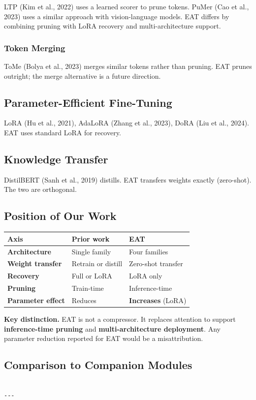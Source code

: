 LTP (Kim et al., 2022) uses a learned scorer to prune tokens. PuMer (Cao et 
al., 2023) uses a similar approach with vision-language models. EAT differs 
by combining pruning with LoRA recovery and multi-architecture support.

\subsubsection{Token Merging}

ToMe (Bolya et al., 2023) merges similar tokens rather than pruning. EAT 
prunes outright; the merge alternative is a future direction.

\subsection{Parameter-Efficient Fine-Tuning}

LoRA (Hu et al., 2021), AdaLoRA (Zhang et al., 2023), DoRA (Liu et al., 2024). 
EAT uses standard LoRA for recovery.

\subsection{Knowledge Transfer}

DistilBERT (Sanh et al., 2019) distills. EAT transfers weights exactly 
(zero-shot). The two are orthogonal.

\subsection{Position of Our Work}

\begin{table}[H]
\centering
\small
\begin{tabular}{lll}
\toprule
\textbf{Axis} & \textbf{Prior work} & \textbf{EAT} \\
\midrule
\textbf{Architecture} & Single family & Four families \\
\textbf{Weight transfer} & Retrain or distill & Zero-shot transfer \\
\textbf{Recovery} & Full or LoRA & LoRA only \\
\textbf{Pruning} & Train-time & Inference-time \\
\textbf{Parameter effect} & Reduces & \textbf{Increases} (LoRA) \\
\bottomrule
\end{tabular}
\end{table}

\textbf{Key distinction.} EAT is not a compressor. It replaces attention to 
support \textbf{inference-time pruning} and \textbf{multi-architecture deployment}. 
Any parameter reduction reported for EAT would be a misattribution.

\subsection{Comparison to Companion Modules}

\begin{lstlisting}

---
\end{lstlisting}